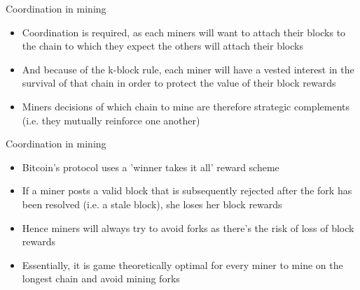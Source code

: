 \documentclass[11pt]{beamer}
\begin{document}

\begin{frame}{Coordination in mining}
	\begin{itemize}
		\item Coordination is required, as each miners will want to attach their blocks to the chain to which they expect the others will attach their blocks
		\item And because of the k-block rule, each miner will have a vested interest in the survival of that chain in order to protect the value of their block rewards
		\item Miners decisions of which chain to mine are therefore strategic complements (i.e. they mutually reinforce one another)
	\end{itemize}
\end{frame}



\begin{frame}{Coordination in mining}
	\begin{itemize}
		\item Bitcoin's protocol uses a 'winner takes it all' reward scheme
		\item If a miner posts a valid block that is subsequently rejected after the fork has been resolved (i.e. a stale block), she loses her block rewards
		\item Hence miners will always try to avoid forks as there's the risk of loss of block rewards
		\item Essentially, it is game theoretically optimal for every miner to mine on the longest chain and avoid mining forks
	\end{itemize}
\end{frame}

\end{document}
